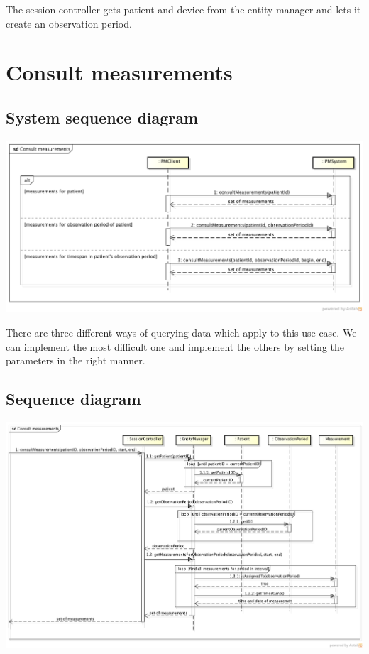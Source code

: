 \documentclass[fontsize=12pt,
               paper=a4,
               twoside=false,
               parskip=half,
               ]{scrartcl}
\begin{document}
The session controller gets patient and device from the entity manager and lets it create an observation period.

\section{Consult measurements}

\subsection{System sequence diagram}

\includegraphics[width=15cm]{./img/system-sequence-diagrams/consult-measurements.png}

There are three different ways of querying data which apply to this use case. We can implement the most difficult one and implement the others by setting the parameters in the right manner.

\subsection{Sequence diagram}

\includegraphics[width=15cm]{./img/sequence-diagrams/consult-measurements.png}
\end{document}
